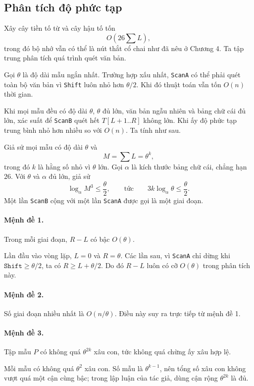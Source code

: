 \documentclass[11pt]{article}
\begin{document}
\subsection{Phân tích độ phức tạp}

Xây cây tiền tố từ và cây hậu tố tốn
\[
  O\left(26\sum L\right),
\]
trong đó bộ nhớ vẫn có thể là nút thắt cổ chai như đã nêu ở Chương 4. Ta tập
trung phân tích quá trình quét văn bản.

Gọi $\theta$ là độ dài mẫu ngắn nhất. Trường hợp xấu nhất, \texttt{ScanA} có
thể phải quét toàn bộ văn bản vì \texttt{Shift} luôn nhỏ hơn $\theta/2$. Khi
đó thuật toán vẫn tốn $O(n)$ thời gian.

Khi mọi mẫu đều có độ dài $\theta$, $\theta$ đủ lớn, văn bản ngẫu nhiên và
bảng chữ cái đủ lớn, xác suất để \texttt{ScanB} quét hết $T[L+1..R]$ không
lớn. Khi ấy độ phức tạp trung bình nhỏ hơn nhiều so với $O(n)$. Ta tính như
sau.

Giả sử mọi mẫu có độ dài $\theta$ và
\[
  M=\sum L=\theta^k,
\]
trong đó $k$ là hằng số nhỏ vì $\theta$ lớn. Gọi $\alpha$ là kích thước bảng
chữ cái, chẳng hạn $26$. Với $\theta$ và $\alpha$ đủ lớn, giả sử
\[
  \log_\alpha M^3 \le \frac{\theta}{2},
  \qquad\text{tức}\qquad
  3k\log_\alpha\theta\le \frac{\theta}{2}.
\]
Một lần \texttt{ScanB} cộng với một lần \texttt{ScanA} được gọi là một giai
đoạn.

\paragraph{Mệnh đề 1.}
Trong mỗi giai đoạn, $R-L$ có bậc $O(\theta)$.

Lần đầu vào vòng lặp, $L=0$ và $R=\theta$. Các lần sau, vì \texttt{ScanA} chỉ
dừng khi $\texttt{Shift}\ge \theta/2$, ta có $R\ge L+\theta/2$. Do đó
$R-L$ luôn có cỡ $O(\theta)$ trong phân tích này.

\paragraph{Mệnh đề 2.}
Số giai đoạn nhiều nhất là $O(n/\theta)$. Điều này suy ra trực tiếp từ mệnh
đề 1.

\paragraph{Mệnh đề 3.}
Tập mẫu $P$ có không quá $\theta^{2k}$ xâu con, tức không quá chừng ấy xâu hợp
lệ.

Mỗi mẫu có không quá $\theta^2$ xâu con. Số mẫu là $\theta^{k-1}$, nên tổng số
xâu con không vượt quá một cận cùng bậc; trong lập luận của tác giả, dùng cận
rộng $\theta^{2k}$ là đủ.
\end{document}
